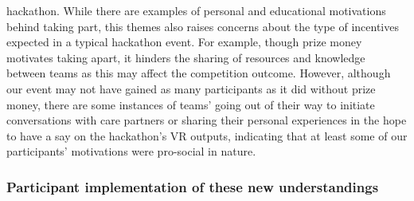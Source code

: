 hackathon. While there are examples of personal and educational motivations behind taking part, this themes also raises concerns about the type of incentives expected in a typical hackathon event. For example, though prize money motivates taking apart, it hinders the sharing of resources and knowledge between teams as this may affect the competition outcome. However, although our event may not have gained as many participants as it did without prize money, there are some instances of teams’ going out of their way to initiate conversations with care partners or sharing their personal experiences in the hope to have a say on the hackathon’s VR outputs, indicating that at least some of our participants’ motivations were pro-social in nature.
\subsubsection{Participant implementation of these new understandings}
\label{ThemeOne:subthemeTwo}
